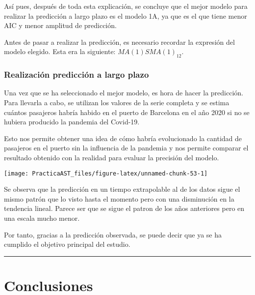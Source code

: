 \documentclass[
]{article}
\begin{document}
Así pues, después de toda esta explicación, se concluye que el mejor
modelo para realizar la predicción a largo plazo es el modelo 1A, ya que
es el que tiene menor AIC y menor amplitud de predicción.

Antes de pasar a realizar la predicción, es necesario recordar la
expresión del modelo elegido. Esta era la siguiente:
\(MA(1)SMA(1)_{12}\).

\medskip

\hypertarget{realizaciuxf3n-predicciuxf3n-a-largo-plazo}{%
\subsubsection{Realización predicción a largo
plazo}\label{realizaciuxf3n-predicciuxf3n-a-largo-plazo}}

Una vez que se ha seleccionado el mejor modelo, es hora de hacer la
predicción. Para llevarla a cabo, se utilizan los valores de la serie
completa y se estima cuántos pasajeros habría habido en el puerto de
Barcelona en el año 2020 si no se hubiera producido la pandemia del
Covid-19.

Esto nos permite obtener una idea de cómo habría evolucionado la
cantidad de pasajeros en el puerto sin la influencia de la pandemia y
nos permite comparar el resultado obtenido con la realidad para evaluar
la precisión del modelo.

\begin{center}\texttt{[image: PracticaAST\_files/figure-latex/unnamed-chunk-53-1]} \end{center}

Se observa que la predicción en un tiempo extrapolable al de los datos
sigue el mismo patrón que lo visto hasta el momento pero con una
disminución en la tendencia lineal. Parece ser que se sigue el patron de
los años anteriores pero en una escala mucho menor.

Por tanto, gracias a la predicción observada, se puede decir que ya se
ha cumplido el objetivo principal del estudio.

\begin{center}\rule{0.5\linewidth}{0.5pt}\end{center}

\pagebreak

\hypertarget{conclusiones}{%
\section{Conclusiones}\label{conclusiones}}
\end{document}
